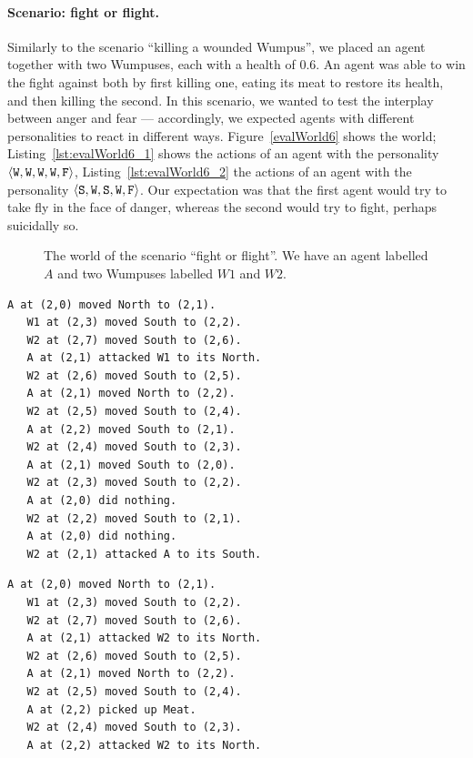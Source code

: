 \paragraph{Scenario: fight or flight.}  Similarly to the scenario ``killing a wounded Wumpus'', we placed an agent together with two Wumpuses, each with a health of 0.6. An agent was able to win the fight against both by first killing one, eating its meat to restore its health, and then killing the second. In this scenario, we wanted to test the interplay between anger and fear --- accordingly, we expected agents with different personalities to react in different ways. Figure~\ref{evalWorld6} shows the world; Listing~\ref{lst:evalWorld6_1} shows the actions of an agent with the personality $\langle \mathtt{W},\mathtt{W}, \mathtt{W}, \mathtt{W}, \mathtt{F} \rangle$, Listing~\ref{lst:evalWorld6_2} the actions of an agent with the personality $\langle \mathtt{S},\mathtt{W}, \mathtt{S}, \mathtt{W}, \mathtt{F} \rangle$. Our expectation was that the first agent would try to take fly in the face of danger, whereas the second would try to fight, perhaps suicidally so.

\begin{figure}
    \centering
    
    \caption{The world of the scenario ``fight or flight''. We have an agent labelled $A$ and two Wumpuses labelled $W1$ and $W2$.}
    \label{fig:evalWorld6}
\end{figure}

\begin{lstlisting}[caption=Actions of an agent with the personality $\personality{W}{W}{W}{W}{F}$ in the scenario ``fight or flight''., label=lst:evalWorld6_1]
   A at (2,0) moved North to (2,1).
   W1 at (2,3) moved South to (2,2).
   W2 at (2,7) moved South to (2,6).
   A at (2,1) attacked W1 to its North.
   W2 at (2,6) moved South to (2,5).
   A at (2,1) moved North to (2,2).
   W2 at (2,5) moved South to (2,4).
   A at (2,2) moved South to (2,1).
   W2 at (2,4) moved South to (2,3).
   A at (2,1) moved South to (2,0).
   W2 at (2,3) moved South to (2,2).
   A at (2,0) did nothing.
   W2 at (2,2) moved South to (2,1).
   A at (2,0) did nothing.
   W2 at (2,1) attacked A to its South.
\end{lstlisting}

\begin{lstlisting}[caption=Actions of an agent with the personality $\personality{S}{W}{S}{W}{F}$ in the scenario ``fight or flight''., label=lst:evalWorld6_2]
   A at (2,0) moved North to (2,1).
   W1 at (2,3) moved South to (2,2).
   W2 at (2,7) moved South to (2,6).
   A at (2,1) attacked W2 to its North.
   W2 at (2,6) moved South to (2,5).
   A at (2,1) moved North to (2,2).
   W2 at (2,5) moved South to (2,4).
   A at (2,2) picked up Meat.
   W2 at (2,4) moved South to (2,3).
   A at (2,2) attacked W2 to its North.
\end{lstlisting}

